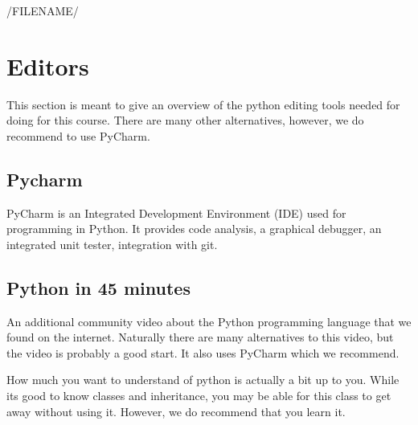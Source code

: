 /FILENAME/
\section{Editors}\label{introduction}

This section is meant to give an overview of the python editing tools needed for doing for this course. There are many other alternatives, however, we do recommend to use PyCharm.

\subsection{Pycharm}\label{s:pycharm}

PyCharm is an Integrated Development Environment (IDE) used for programming in
Python. It provides code analysis, a graphical debugger, an integrated
unit tester, integration with git.


\subsection{Python in 45 minutes}\label{python-in-45-minutes}

An additional community video about the Python programming language that
we found on the internet. Naturally there are many alternatives to this
video, but the video is probably a good start. It also uses PyCharm
which we recommend.


How much you want to understand of python is actually a bit up to you.
While its good to know classes and inheritance, you may be able for this
class to get away without using it. However, we do recommend that you
learn it.

